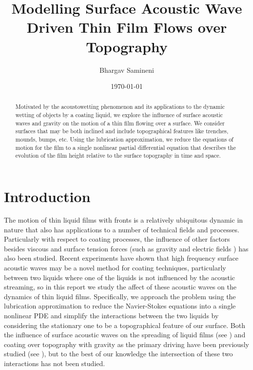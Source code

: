 \documentclass{article}
\title{Modelling Surface Acoustic Wave Driven Thin Film Flows over Topography}
\author{Bhargav Samineni}
\date{\today}
\begin{document}
 
\maketitle  

\begin{abstract}
    Motivated by the acoustowetting phenomenon and its applications to the dynamic wetting 
    of objects by a coating liquid, we explore the influence of surface acoustic waves and gravity on the motion of a thin film
    flowing over a surface. We consider surfaces that may be both inclined and include topographical features like trenches, mounds, bumps, etc. 
    Using the lubrication approximation, we reduce the equations of motion for the film
    to a single nonlinear partial differential equation that describes the evolution of the film height relative to the 
    surface topography in time and space. 
\end{abstract}
  
 
\section{Introduction}
The motion of thin liquid films with fronts is a relatively
ubiquitous dynamic in nature that also has applications to a number of technical fields and processes. 
Particularly with respect to coating processes, the influence of other factors besides viscous and surface tension
forces (such as gravity \cite{diez2002computing} and electric fields \cite{veremieiev2012electrified}) has also been 
studied. Recent experiments have shown that high frequency surface acoustic waves may be a novel method 
for coating techniques, particularly between two liquids where one of the liquids is not influenced by the acoustic streaming, so in this report we study the affect of these acoustic waves on the dynamics 
of thin liquid films. Specifically, we approach the problem using the lubrication approximation to reduce the 
Navier-Stokes equations into a single nonlinear PDE and simplify the interactions between the two liquids
by considering the stationary one to be a topographical feature of our surface. Both the influence of surface acoustic
waves on the spreading of liquid films (see \cite{altshuler2016free}) and coating over topography with gravity as the primary driving have been previously 
studied (see \cite{kalliadasis2000steady,stillwagon1988topo,veremieiev2011gravity}), but to the best of our knowledge the 
intersection of these two interactions has not been studied. 
\end{document}
